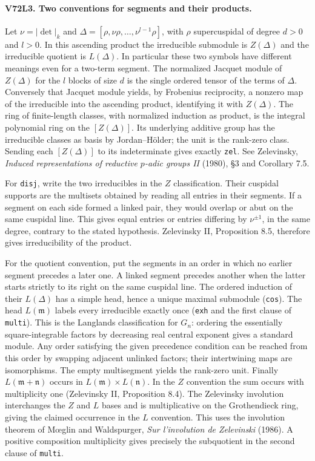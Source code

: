 \paragraph{V72L3. Two conventions for segments and their products.}
Let $\nu=|\det|_k$ and
$\Delta=[\rho,\nu\rho,\ldots,\nu^{l-1}\rho]$, with $\rho$
supercuspidal of degree $d>0$ and $l>0$. In this ascending product
the irreducible submodule is $Z(\Delta)$ and the irreducible
quotient is $L(\Delta)$. In particular these two symbols have
different meanings even for a two-term segment. The normalized
Jacquet module of $Z(\Delta)$ for the $l$ blocks of size $d$ is
the single ordered tensor of the terms of $\Delta$. Conversely that
Jacquet module yields, by Frobenius reciprocity, a nonzero map of
the irreducible into the ascending product, identifying it with
$Z(\Delta)$. The ring of finite-length classes, with normalized
induction as product, is the integral polynomial ring on the
$[Z(\Delta)]$. Its underlying additive group has the irreducible
classes as basis by Jordan--H\"older; the unit is the rank-zero
class. Sending each $[Z(\Delta)]$ to its indeterminate gives
exactly \texttt{zel}. See Zelevinsky, \emph{Induced representations
of reductive $p$-adic groups II} (1980), \S3 and Corollary 7.5.

For \texttt{disj}, write the two irreducibles in the $Z$ classification.
Their cuspidal supports are the multisets obtained by reading all
entries in their segments. If a segment on each side formed a linked
pair, they would overlap or abut on the same cuspidal line. This gives
equal entries or entries differing by $\nu^{\pm1}$, in the same degree,
contrary to the stated hypothesis. Zelevinsky II, Proposition 8.5,
therefore gives irreducibility of the product.

For the quotient convention, put the segments in an order in which
no earlier segment precedes a later one. A linked segment precedes
another when the latter starts strictly to its right on the same
cuspidal line. The ordered induction of their $L(\Delta)$ has a
simple head, hence a unique maximal submodule (\texttt{cos}).
The head $L(\mathfrak m)$ labels every irreducible exactly once
(\texttt{exh} and the first clause of \texttt{multi}). This is the
Langlands classification for $G_n$: ordering the essentially
square-integrable factors by decreasing real central exponent gives
a standard module. Any order satisfying the given precedence
condition can be reached from this order by swapping adjacent
unlinked factors; their intertwining maps are isomorphisms.
The empty multisegment yields the rank-zero unit. Finally
$L(\mathfrak m+\mathfrak n)$ occurs in
$L(\mathfrak m)\times L(\mathfrak n)$. In the $Z$ convention the
sum occurs with multiplicity one (Zelevinsky II, Proposition 8.4).
The Zelevinsky involution interchanges the $Z$ and $L$ bases and is
multiplicative on the Grothendieck ring, giving the claimed occurrence
in the $L$ convention. This uses the involution theorem of
M\oe glin and Waldspurger, \emph{Sur l'involution de Zelevinski}
(1986). A positive composition multiplicity gives precisely the
subquotient in the second clause of \texttt{multi}.

